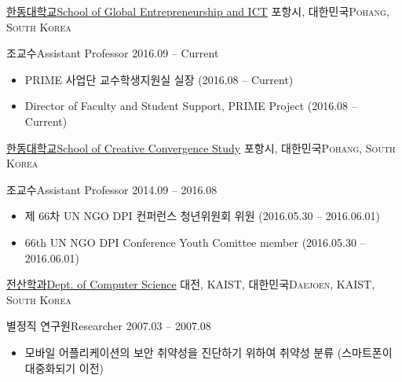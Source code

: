 \documentclass[english,representative]{resume_structure}
\begin{document}
\begin{Work}
\ResumeSectionWithSubSection %
{\href{http://www.handong.edu}{한동대학교}}{\href{http://www.handong.edu}{School of Global Entrepreneurship and ICT}}
{\textsc{포항시, 대한민국}}{\textsc{Pohang, South Korea}} {
  \ResumeSubSection %
    {조교수}{Assistant Professor}
    {2016.09 -- Current}
    {
    \begin{itemize}
      \item PRIME 사업단 교수학생지원실 실장 (2016.08 -- Current)
    \end{itemize}
    }
    {
    \begin{itemize}
      \item Director of Faculty and Student Support, PRIME Project (2016.08 -- Current)
    \end{itemize}
    }
}
\ResumeSectionWithSubSection %
{\href{http://www.handong.edu}{한동대학교}}{\href{http://www.handong.edu}{School of Creative Convergence Study}}
{\textsc{포항시, 대한민국}}{\textsc{Pohang, South Korea}} {
  \ResumeSubSection %
    {조교수}{Assistant Professor}
    {2014.09 -- 2016.08}
    {
    \begin{itemize}
      \item 제 66차 UN NGO DPI 컨퍼런스 청년위원회 위원 (2016.05.30 -- 2016.06.01)
    \end{itemize}
    }
    {
    \begin{itemize}
      \item 66th UN NGO DPI Conference Youth Comittee member (2016.05.30 -- 2016.06.01)
    \end{itemize}
    }
}
\ResumeSectionWithSubSection %
{\href{http://cs.kaist.ac.kr}{전산학과}}{\href{http://cs.kaist.ac.kr}{Dept. of Computer Science}}
{\textsc{대전, KAIST, 대한민국}}{\textsc{Daejoen, KAIST, South Korea}} {
  \ResumeSubSection %
    {별정직 연구원}{Researcher}
    {2007.03 -- 2007.08}
    {
    \begin{itemize}
      \item 모바일 어플리케이션의 보안 취약성을 진단하기 위하여 취약성 분류 (스마트폰이 대중화되기 이전)

\end{itemize}}}
\end{Work}
\end{document}
